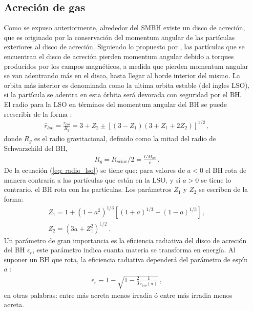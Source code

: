 \subsection{Acreción de gas}
\label{subsec: Acrecion_gas}
Como se expuso anteriormente, alrededor del SMBH existe un disco de acreción, que es originado por la conservación del momentum angular de las partículas exteriores al disco de acreción. Siguiendo lo propuesto por \cite{lynden1969}, las partículas que se encuentran el disco de acreción pierden momentum angular debido a torques producidos por los campos magnéticos, a medida que pierden momentum angular se van adentrando más en el disco, hasta llegar al borde interior del mismo. La orbita más interior es denominada como la ultima orbita estable (del ingles LSO), si la partícula se adentra en esta órbita será devorada con seguridad por el BH. El radio para la LSO en términos del momentum angular del BH se puede reescribir de la forma \cite{bardeen1972}:
%
\begin{align}
 \hat{r}_{lso}=\frac{r_{lso}}{R_g}=3+Z_{2}\pm \left[ (3-Z_{1})(3+Z_{1}+2Z_{2})\right]^{1/2} \,,
 \label{eq: radio_lso}
\end{align}
%
donde $R_{g}$ es el radio gravitacional, definido como la mitad del radio de Schwarzchild del BH, 
%
\begin{align}
    R_{g}= R_{schw}/2  = \frac{GM_{bh}}{c}\,.
\end{align}
%
De la ecuación (\ref{eq: radio_lso}) se tiene que: para valores de $a<0$ el BH rota de manera contraría a las partículas que están en la LSO, y si $a>0$ se tiene lo contrario, el BH rota con las partículas. Los parámetros $Z_1$ y $Z_2$ se escriben de la forma:
%
\begin{eqnarray}
    Z_1 = 1+(1-a^{2})^{1/3}\left[(1+a)^{1/3}+(1-a)^{1/3} \right]\,,\\
    Z_2 = (3a+Z_{1}^{2})^{1/2}\,.
\end{eqnarray}
%
Un parámetro de gran importancia es la eficiencia radiativa del disco de acreción del BH $\epsilon_{r}$, este parámetro indica cuanta materia se transforma en energía. Al suponer un BH que rota, la eficiencia radiativa dependerá del parámetro de espín $a$ \cite{novikov1973}:
%
\begin{align}
    \epsilon_{r} \equiv 1- \sqrt{1-\frac{2}{3}\frac{1}{\hat{r}_{lso}(a)}}\,,
    \label{eq: eficiencia radiativa}
\end{align}
%
en otras palabras: entre más acreta menos irradia ó entre más irradia menos acreta.

